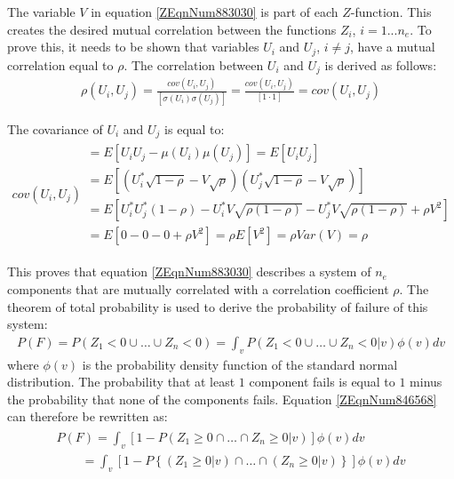 {The variable $V$ in equation \eqref{ZEqnNum883030} is part of each $Z$-function.
This creates the desired mutual correlation between the functions $Z_i$, $i=1...n_e$.
To prove this, it needs to be shown that variables $U_i$ and $U_j$, $i\neq j$, have a mutual correlation equal to $\rho$.
The correlation between $U_i$ and $U_j$ is derived as follows:
\begin{align}
\rho \left(U_{i} ,U_{j} \right)=\frac{cov\left(U_{i} ,U_{j} \right)}{\left[\sigma \left(U_{i} \right)\sigma \left(U_{j} \right)\right]} =\frac{cov\left(U_{i} ,U_{j} \right)}{\left[1\cdot 1\right]} =cov\left(U_{i} ,U_{j} \right)\label{0.134)} 
\end{align}

The covariance of $U_i$ and $U_j$ is equal to:
\begin{align}
cov\left(U_{i} ,U_{j} \right) \begin{array}{l} {=E\left[U_{i} U_{j} -\mu \left(U_{i} \right)\mu \left(U_{j} \right)\right]=E\left[U_{i} U_{j} \right]} \\ {=E\left[\left(U_{i}^{*} \sqrt{1-\rho } -V\sqrt{\rho } \right)\left(U_{j}^{*} \sqrt{1-\rho } -V\sqrt{\rho } \right)\right]} \\ {=E\left[U_{i}^{*} U_{j}^{*} \left(1-\rho \right)-U_{i}^{*} V\sqrt{\rho \left(1-\rho \right)} -U_{j}^{*} V\sqrt{\rho \left(1-\rho \right)} +\rho V^{2} \right]} \\ {=E\left[0-0-0+\rho V^{2} \right]=\rho E\left[V^{2} \right]=\rho Var\left(V\right)=\rho } \end{array}\label{0.135)} 
\end{align}

This proves that equation \eqref{ZEqnNum883030} describes a system of $n_{e}$ components that are mutually correlated with a correlation coefficient $\rho$.
The theorem of total probability is used to derive the probability of failure of this system: 
\begin{align}
P(F)=P\left(Z_{1} <0  \cup   \dots  \cup Z_{n} <0\right)=\int _{v}^{}P\left(Z_{1} <0  \cup   \dots  \cup Z_{n} <0|v\right)\phi \left(v\right)dv \label{ZEqnNum846568} 
\end{align}
where $\phi(v)$ is the probability density function of the standard normal distribution.
The probability that at least $1$ component fails is equal to $1$ minus the probability that none of the components fails.
Equation \eqref{ZEqnNum846568} can therefore be rewritten as:
\begin{align}
\begin{array}{l} {P(F)=\int _{v}^{}\left[1-P\left(Z_{1} \ge 0  \cap     \dots  \cap Z_{n} \ge 0|v\right)\right]\phi \left(v\right)dv } \\ {\quad \quad   =\int _{v}^{}\left[1-P\left\{\left(Z_{1} \ge 0|v\right)\cap  \dots  \cap  \left(Z_{n} \ge 0|v\right)\right\}\right]\phi \left(v\right)dv } \end{array}\label{ZEqnNum753473} 
\end{align}

}
